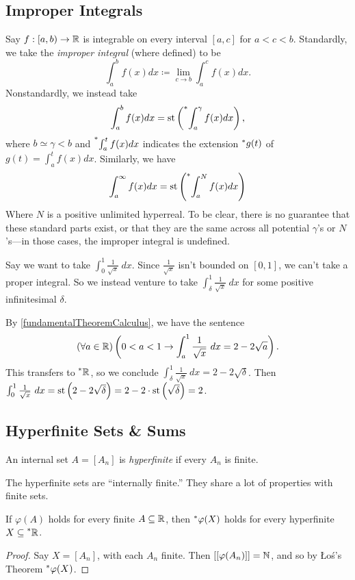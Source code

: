 \subsection{Improper Integrals}
Say $f: [a, b) \to \mathbb{R}$ is integrable on every interval $[a, c]$ for $a < c < b$. Standardly, we take the \textit{improper integral} (where defined) to be
\[
\int_a^b f(x)dx \coloneq \lim_{c \to b} \int_a^c f(x)dx.
\]
Nonstandardly, we instead take
\[
\int_a^b f(x)dx = \operatorname{st}\left(\prescript{*}{}{\int_a^\gamma f(x)dx}\right),
\]
where $b \simeq \gamma < b$ and $\prescript{*}{}{\int_a^t f(x)dx}$ indicates the extension $\prescript{*}{}{g}(t)$ of $g(t) = \int_a^t f(x)dx$. Similarly, we have
\[
\int_a^\infty f(x)dx = \operatorname{st}\left(\prescript{*}{}{\int_a^N f(x)dx}\right)
\]
Where $N$ is a positive unlimited hyperreal. To be clear, there is no guarantee that these standard parts exist, or that they are the same across all potential $\gamma$'s or $N$'s---in those cases, the improper integral is undefined.

Say we want to take $\int_0^1 \frac{1}{\sqrt{x}}\ dx$. Since $\frac{1}{\sqrt{x}}$ isn't bounded on $[0, 1]$, we can't take a proper integral. So we instead venture to take $\int_\delta^1 \frac{1}{\sqrt{x}}\ dx$ for some positive infinitesimal $\delta$. 

By \ref{fundamentalTheoremCalculus}, we have the sentence
\[
(\forall a \in \mathbb{R})\left(0 < a < 1 \to \int_a^1 \frac{1}{\sqrt{x}}\ dx = 2 - 2 \sqrt{a}\right).
\]
This transfers to $\prescript{*}{}{\mathbb{R}}$, so we conclude $\int_\delta^1 \frac{1}{\sqrt{x}}\ dx = 2 - 2\sqrt{\delta}$. Then $\int_0^1 \frac{1}{\sqrt{x}}\ dx = \operatorname{st}\left(2 - 2 \sqrt{\delta}\right) = 2 - 2 \cdot \operatorname{st}\left(\sqrt{\delta}\right) = 2$.  

\subsection{Hyperfinite Sets \& Sums}
\begin{defn}
    An internal set $A = [A_n]$ is \textit{hyperfinite} if every $A_n$ is finite.
\end{defn}

The hyperfinite sets are ``internally finite.'' They share a lot of properties with finite sets.

\begin{thm}\label{HyperfiniteTransfer}
    If $\varphi(A)$ holds for every finite $A \subseteq \mathbb{R}$, then $\prescript{*}{}{\varphi}(X)$ holds for every hyperfinite $X \subseteq \prescript{*}{}{\mathbb{R}}$.
\end{thm}

\begin{proof}
    Say $X = [A_n]$, with each $A_n$ finite. Then $[[\varphi(A_n)]] = \mathbb{N}$, and so by \L o\'s's Theorem $\prescript{*}{}{\varphi}(X)$.
\end{proof}

